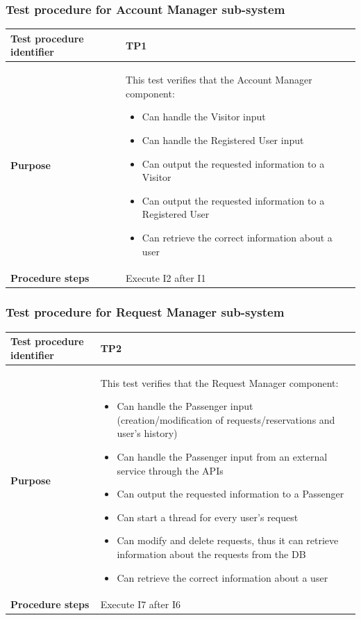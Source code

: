 \documentclass[a4paper,11pt]{report} %
\begin{document}
			\subsubsection{Test procedure for Account Manager sub-system} \label{sec:3.2.1}
				\begin{center}
					\begin{tabular}{| l | p{9.5cm} |}\hline
						\textbf{Test procedure identifier} & TP1\\\hline
						\textbf{Purpose} & This test verifies that the Account Manager component: \begin{itemize}
							\item Can handle the Visitor input
							\item Can handle the Registered User input
							\item Can output the requested information to a Visitor
							\item Can output the requested information to a Registered User
							\item Can retrieve the correct information about a user
						\end{itemize}\\\hline
						\textbf{Procedure steps} & Execute I2 after I1 \\\hline
					\end{tabular}
				\end{center}	
		\pagebreak				
			\subsubsection{Test procedure for Request Manager sub-system} \label{sec:3.2.2}
				\begin{center}
					\begin{tabular}{| l | p{9.5cm} |}\hline
						\textbf{Test procedure identifier} & TP2\\\hline
						\textbf{Purpose} & This test verifies that the Request Manager component: \begin{itemize}
							\item Can handle the Passenger input (creation/modification of requests/reservations and user's history)
							\item Can handle the Passenger input from an external service through the APIs
							\item Can output the requested information to a Passenger
							\item Can start a thread for every user's request
							\item Can modify and delete requests, thus it can retrieve information about the requests from the DB
							\item Can retrieve the correct information about a user
						\end{itemize}\\\hline
						\textbf{Procedure steps} & Execute I7 after I6 \\\hline
					\end{tabular}
				\end{center}	
			\bigskip	
\end{document}
